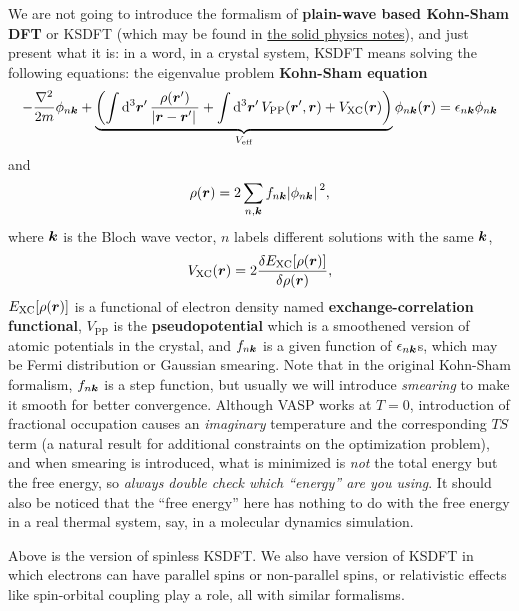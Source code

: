 \documentclass[hyperref, a4paper]{article}
\newcommand*{\concept}[1]{{\textbf{#1}}}
\begin{document}
We are not going to introduce the formalism of \concept{plain-wave based Kohn-Sham DFT} or KSDFT (which may be found in \href{../../solid/solid}{the solid physics notes}), and just present what it is: in a word, in a crystal system, KSDFT means solving the following equations: the eigenvalue problem \concept{Kohn-Sham equation}
\begin{equation}
    - \frac{\laplacian}{2m} \phi_{n \vb*{k}} + \underbrace{\left( \int \dd[3]{\vb*{r}'} \frac{\rho(\vb*{r}')}{\abs*{\vb*{r} - \vb*{r}'}} + \int \dd[3]{\vb*{r}'} V_\text{PP}(\vb*{r}', \vb*{r}) + V_\text{XC}(\vb*{r}) \right)}_{V_\text{eff}} \phi_{n \vb*{k}}(\vb*{r}) = \epsilon_{n \vb*{k}} \phi_{n \vb*{k}}
\end{equation}
and
\begin{equation}
    \rho(\vb*{r}) = 2 \sum_{n, \vb*{k}} f_{n \vb*{k}} \abs*{\phi_{n \vb*{k}}}^2,
\end{equation}
where $\vb*{k}$ is the Bloch wave vector, $n$ labels different solutions with the same $\vb*{k}$,
\begin{equation}
    V_\text{XC}(\vb*{r}) = 2 \fdv{E_\text{XC}[\rho(\vb*{r})]}{\rho(\vb*{r})},
\end{equation}
$E_\text{XC}[\rho(\vb*{r})]$ is a functional of electron density named \concept{exchange-correlation functional}, 
$V_\text{PP}$ is the \concept{pseudopotential} which is a smoothened version of atomic potentials in the crystal,
and $f_{n \vb*{k}}$ is a given function of $\epsilon_{n \vb*{k}}$s, which may be Fermi distribution or Gaussian smearing.
Note that in the original Kohn-Sham formalism, $f_{n \vb*{k}}$ is a step function, but usually we will introduce \emph{smearing} to make it smooth for better convergence.
Although VASP works at $T=0$, introduction of fractional occupation causes an \emph{imaginary} temperature and the corresponding $TS$ term (a natural result for additional constraints on the optimization problem), and when smearing is introduced, what is minimized is \emph{not} the total energy but the free energy, so \emph{always double check which ``energy'' are you using}.
It should also be noticed that the ``free energy'' here has nothing to do with the free energy in a real thermal system, say, in a molecular dynamics simulation.

Above is the version of spinless KSDFT. We also have version of KSDFT in which electrons can have parallel spins or non-parallel spins, or relativistic effects like spin-orbital coupling play a role, all with similar formalisms.
\end{document}

